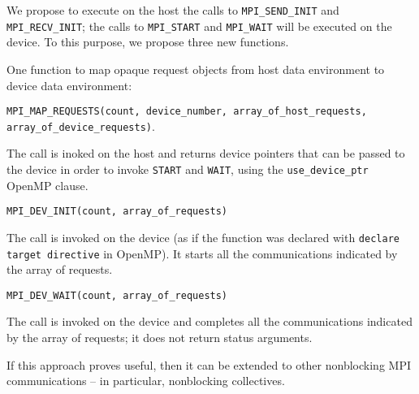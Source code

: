 We propose to execute on the host the calls to \texttt{MPI\_SEND\_INIT} and 
\texttt{MPI\_RECV\_INIT}; the calls to \texttt{MPI\_START} and 
\texttt{MPI\_WAIT} will be executed on the device. To this purpose, we propose 
three new functions.

One function to map opaque request objects from host data environment to device 
data environment:

\texttt{MPI\_MAP\_REQUESTS(count, device\_number, array\_of\_host\_requests, 
array\_of\_device\_requests)}.

The call is inoked on the host and returns device pointers that can be passed 
to the device in order to 
invoke \texttt{START} and \texttt{WAIT}, using the \texttt{use\_device\_ptr} 
OpenMP clause.

\texttt{MPI\_DEV\_INIT(count, array\_of\_requests)}

The call is invoked on the device (as if the function was declared with 
\texttt{declare target directive} in OpenMP). It starts all the communications 
indicated by the array of requests.
	
\texttt{MPI\_DEV\_WAIT(count, array\_of\_requests)}	

The call is invoked on the device and completes all the communications 
indicated by the array of requests; it does not return status arguments.

If this approach proves useful, then it can be extended to other nonblocking 
MPI communications -- in particular, nonblocking collectives.








	\